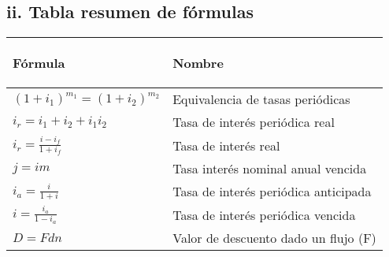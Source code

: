 \begin{center}
	\section*{ii. Tabla resumen de fórmulas}
\end{center}

\begin{spacing}{1}
	\begin{center}
		\begin{tabular}{ |p{7cm}|p{7cm}|}
			\hline
			\rowcolor{orange!50}
			
			\begin{center}\textbf{Fórmula} \end{center}                                                                   & \begin{center} \textbf{Nombre} \end{center}                                 \\ \hline
			
			$(1 + i_{1})^{m_1} = (1 + i_{2})^{m_2}$                                                      & Equivalencia de tasas periódicas                           \\\hline
			
			$i_{r} = i_{1} + i_{2} + i_{1}i_{2}$                                                         & Tasa de interés periódica real                             \\ \hline
			$i_r = \frac{i - i_f}{1 + i_f}$                                                              & Tasa de interés real                                       \\ \hline
			
			$j = im$                                                                                     & Tasa interés nominal anual vencida                         \\ \hline
			
			
			$i_a = \frac{i}{1 + i}$                                                                      & Tasa de interés periódica anticipada                       \\ \hline
			
			$i = \frac{i_a}{1 - i_a}$                                                                    & Tasa de interés periódica vencida                          \\ \hline
			$D = Fdn$                                                                                    & Valor de descuento dado un flujo (F)                       \\ \hline
			

\end{tabular}
\end{center}
\end{spacing}
